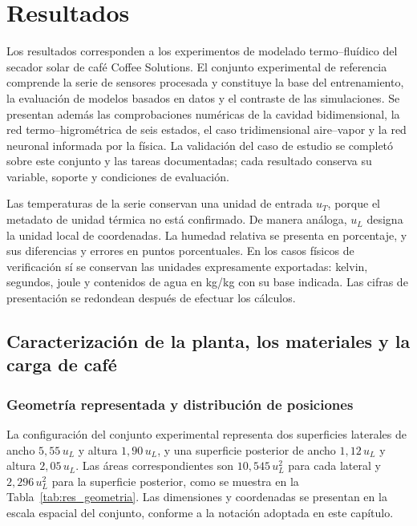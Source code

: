 \providecommand{\rutafigurasresultados}{resultados_recursos/figures}
\providecommand{\rutatablasmetodologia}{tablas_metodologia}

\chapter{Resultados}
\label{ch:resultados}

Los resultados corresponden a los experimentos de modelado termo--fluídico del secador solar de café Coffee Solutions. El conjunto experimental de referencia comprende la serie de sensores procesada y constituye la base del entrenamiento, la evaluación de modelos basados en datos y el contraste de las simulaciones. Se presentan además las comprobaciones numéricas de la cavidad bidimensional, la red termo--higrométrica de seis estados, el caso tridimensional aire--vapor y la red neuronal informada por la física. La validación del caso de estudio se completó sobre este conjunto y las tareas documentadas; cada resultado conserva su variable, soporte y condiciones de evaluación.


Las temperaturas de la serie conservan una unidad de entrada $u_T$, porque el metadato de unidad térmica no está confirmado. De manera análoga, $u_L$ designa la unidad local de coordenadas. La humedad relativa se presenta en porcentaje, y sus diferencias y errores en puntos porcentuales. En los casos físicos de verificación sí se conservan las unidades expresamente exportadas: kelvin, segundos, joule y contenidos de agua en kg/kg con su base indicada. Las cifras de presentación se redondean después de efectuar los cálculos.

\section{Caracterización de la planta, los materiales y la carga de café}
\label{res:caracterizacion_planta}

\subsection{Geometría representada y distribución de posiciones}

La configuración del conjunto experimental representa dos superficies laterales de ancho $5{,}55\,u_L$ y altura $1{,}90\,u_L$, y una superficie posterior de ancho $1{,}12\,u_L$ y altura $2{,}05\,u_L$. Las áreas correspondientes son $10{,}545\,u_L^2$ para cada lateral y $2{,}296\,u_L^2$ para la superficie posterior, como se muestra en la Tabla~\ref{tab:res_geometria}. Las dimensiones y coordenadas se presentan en la escala espacial del conjunto, conforme a la notación adoptada en este capítulo.

